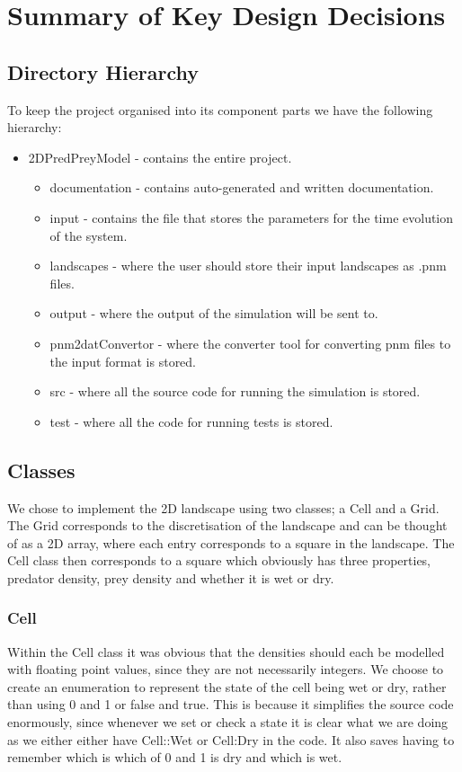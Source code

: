 \section{Summary of Key Design Decisions}
\subsection{Directory Hierarchy}
To keep the project organised into its component parts we have the following hierarchy: 
\begin{itemize}
\item 2DPredPreyModel  - contains the entire project.
\begin{itemize}
\item documentation    - contains auto-generated and written documentation.
\item input            - contains the file that stores the parameters for the time evolution of the system.
\item landscapes       - where the user should store their input landscapes as .pnm files.
\item output           - where the output of the simulation will be sent to.
\item pnm2datConvertor - where the converter tool for converting pnm files to the input format is stored.
\item src              - where all the source code for running the simulation is stored. 
\item test             - where all the code for running tests is stored. 
\end{itemize}
\end{itemize}
\subsection{Classes}
We chose to implement the 2D landscape using two classes; a Cell and a Grid. The Grid corresponds to the discretisation of the landscape and can be thought of as a 2D array, where each entry corresponds to a square in the landscape. The Cell class then corresponds to a square which obviously has three properties, predator density, prey density and whether it is wet or dry.
\subsubsection{Cell}
Within the Cell class it was obvious that the densities should each be modelled with floating point values, since they are not necessarily integers. We choose to create an enumeration to represent the state of the cell being wet or dry, rather than using 0 and 1 or false and true. This is because it simplifies the source code enormously, since whenever we set or check a state it is clear what we are doing as we either either have Cell::Wet or Cell:Dry in the code. It also saves having to remember which is which of 0 and 1 is dry and which is wet. 

